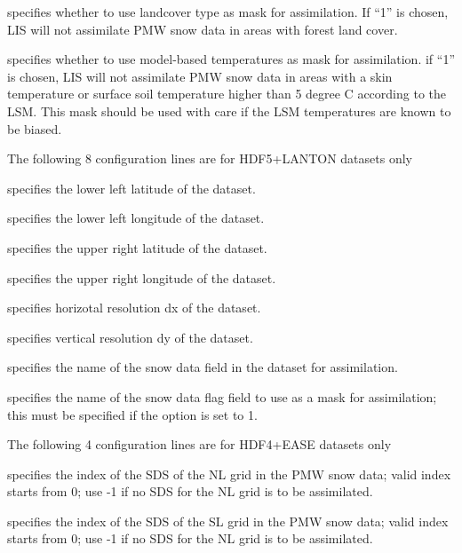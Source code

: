  specifies whether to use landcover type as mask for assimilation.
 If ``1'' is chosen, LIS will not assimilate PMW snow data in areas
 with forest land cover.
 
 specifies whether to use model-based temperatures as mask for
 assimilation. if ``1'' is chosen, LIS will not assimilate PMW snow
 data in areas with a skin temperature or surface soil temperature
 higher than 5 degree C according to the LSM. This mask should be
 used with care if the LSM temperatures are known to be biased.

 The following 8 configuration lines are for HDF5+LANTON datasets only
 
  specifies the lower left latitude
 of the dataset.
 
  specifies the lower left longitude
 of the dataset.
 
  specifies the upper right latitude
 of the dataset.
 
  specifies the upper right longitude
 of the dataset.
 
  specifies horizotal resolution dx
 of the dataset.
 
  specifies vertical resolution dy
 of the dataset.
 
  specifies the name of the snow
 data field in the dataset for assimilation.
 
  specifies the name of the
 snow data
 flag field to use as a mask for assimilation; this must be specified if 
 the  option is set to 1.

 The following 4 configuration lines are for HDF4+EASE datasets only
 
 specifies the index of the SDS of the NL grid in the PMW snow data;
 valid index starts from 0; use -1 if no SDS for the NL grid is to be
 assimilated.

 specifies the index of the SDS of the SL grid in the PMW snow data;
 valid index starts from 0; use -1 if no SDS for the NL grid is to be
 assimilated.

